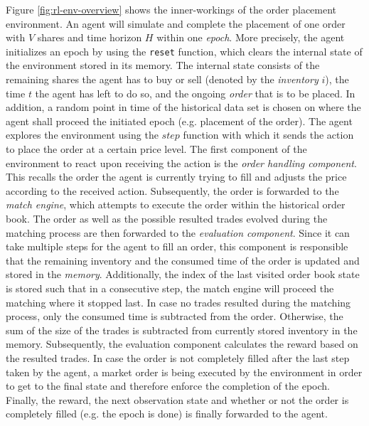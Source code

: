 Figure \ref{fig:rl-env-overview} shows the inner-workings of the order placement environment.
An agent will simulate and complete the placement of one order with $V$ shares and time horizon $H$ within one \textit{epoch}.
More precisely, the agent initializes an epoch by using the \texttt{reset} function, which clears the internal state of the environment stored in its memory.
The internal state consists of the remaining shares the agent has to buy or sell (denoted by the \textit{inventory} $i$), the time $t$ the agent has left to do so, and the ongoing \textit{order} that is to be placed.
In addition, a random point in time of the historical data set is chosen on where the agent shall proceed the initiated epoch (e.g. placement of the order).
The agent explores the environment using the $step$ function with which it sends the action to place the order at a certain price level.
The first component of the environment to react upon receiving the action is the \textit{order handling component}. This recalls the order the agent is currently trying to fill and adjusts the price according to the received action.
Subsequently, the order is forwarded to the \textit{match engine}, which attempts to execute the order within the historical order book.
The order as well as the possible resulted trades evolved during the matching process are then forwarded to the \textit{evaluation component}.
Since it can take multiple steps for the agent to fill an order, this component is responsible that the remaining inventory and the consumed time of the order is updated and stored in the \textit{memory}.
Additionally, the index of the last visited order book state is stored such that in a consecutive step, the match engine will proceed the matching where it stopped last.
In case no trades resulted during the matching process, only the consumed time is subtracted from the order.
Otherwise, the sum of the size of the trades is subtracted from currently stored inventory in the memory.
Subsequently, the evaluation component calculates the reward based on the resulted trades.
In case the order is not completely filled after the last step taken by the agent, a market order is being executed by the environment in order to get to the final state and therefore enforce the completion of the epoch.
Finally, the reward, the next observation state and whether or not the order is completely filled (e.g. the epoch is done) is finally forwarded to the agent.

